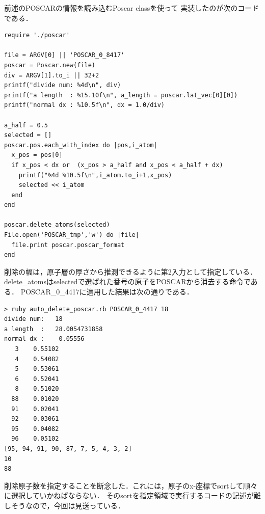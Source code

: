 前述のPOSCARの情報を読み込むPoscar classを使って
実装したのが次のコードである．

\begin{verbatim}
require './poscar'

file = ARGV[0] || 'POSCAR_0_8417'
poscar = Poscar.new(file)
div = ARGV[1].to_i || 32+2
printf("divide num: %4d\n", div)
printf("a length  : %15.10f\n", a_length = poscar.lat_vec[0][0])
printf("normal dx : %10.5f\n", dx = 1.0/div)

a_half = 0.5
selected = []
poscar.pos.each_with_index do |pos,i_atom|
  x_pos = pos[0]
  if x_pos < dx or  (x_pos > a_half and x_pos < a_half + dx)
    printf("%4d %10.5f\n",i_atom.to_i+1,x_pos)
    selected << i_atom
  end
end

poscar.delete_atoms(selected)
File.open('POSCAR_tmp','w') do |file|
  file.print poscar.poscar_format
end
\end{verbatim}

削除の幅は，原子層の厚さから推測できるように第2入力として指定している．
delete\_atomsはselectedで選ばれた番号の原子をPOSCARから消去する命令である．
POSCAR\_0\_4417に適用した結果は次の通りである．

\begin{verbatim}
> ruby auto_delete_poscar.rb POSCAR_0_4417 18
divide num:   18
a length  :   28.0054731858
normal dx :    0.05556
   3    0.55102
   4    0.54082
   5    0.53061
   6    0.52041
   8    0.51020
  88    0.01020
  91    0.02041
  92    0.03061
  95    0.04082
  96    0.05102
[95, 94, 91, 90, 87, 7, 5, 4, 3, 2]
10
88
\end{verbatim}

削除原子数を指定することを断念した．これには，原子のx-座標でsortして順々に選択していかねばならない．
そのsortを指定領域で実行するコードの記述が難しそうなので，今回は見送っている．

    